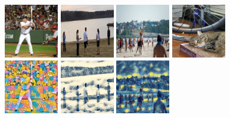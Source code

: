 \documentclass[runningheads]{llncs}
\begin{document}
\begin{figure}[t]
  \centering
  \includegraphics[width=0.21\textwidth]{563_orig_512.jpg} 
  \includegraphics[width=0.21\textwidth]{487_orig_512.jpg}
  \includegraphics[width=0.21\textwidth]{494_orig_512.jpg}
  \includegraphics[width=0.21\textwidth]{1071_orig_512.jpg} \\
  \includegraphics[width=0.21\textwidth]{563_simpsons_512.jpg}
  \includegraphics[width=0.21\textwidth]{487_the_wave_512.jpg}
  \includegraphics[width=0.21\textwidth]{494_starry_night_512.jpg}

\end{figure}
\end{document}
